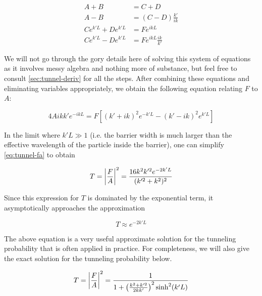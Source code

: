 \begin{align*}
	A + B &= C + D \\
	A - B &= (C - D)\frac{k'}{ik} \\
	Ce^{k'L} + De^{k'L} &= Fe^{ikL} \\
	Ce^{k'L} - De^{k'L} &= Fe^{ikL}\frac{ik}{k'}
\end{align*}

We will not go through the gory details here of solving this system of equations as it involves messy algebra and nothing more of substance, but feel free to consult \autoref{sec:tunnel-deriv} for all the steps. 
After combining these equations and eliminating variables appropriately, we obtain the following equation relating $F$ to $A$:

\begin{equation}
	4Aikk'e^{-ikL} = F \left[(k'+ik)^2e^{-k'L} - (k'-ik)^2e^{k'L}\right] \label{eq:tunnel-fa}
\end{equation}

In the limit where $k'L \gg 1$ (i.e. the barrier width is much larger than the effective wavelength of the particle inside the barrier), one can simplify \autoref{eq:tunnel-fa} to obtain

\begin{equation}
	T = \abs{\frac{F}{A}}^2 = \frac{16k^2k^{\prime 2}e^{-2k'L}}{(k^{\prime 2}+k^2)^2} \label{eq:tunnel-prob}
\end{equation}

Since this expression for $T$ is dominated by the exponential term, it asymptotically approaches the approximation

\begin{tcolorbox}[title = Tunneling probability approximation when $E < V_0$] \vspace{-2ex}
	\begin{equation}
		T \approx e^{-2k'L} \label{eq:tunnel-approx}
	\end{equation}
\end{tcolorbox}

The above equation is a very useful approximate solution for the tunneling probability that is often applied in practice. 
For completeness, we will also give the exact solution for the tunneling probability below.

\begin{tcolorbox}[title = Tunneling probability exact solution when $E < V_0$] \vspace{-2ex}
	\begin{equation}
		T = \abs{\frac{F}{A}}^2 = \frac{1}{1 + \left(\frac{k^2+k^{\prime 2}}{2kk'}\right)^2 \sinh^2(k'L)} \label{eq:tunnel-prob-full}
	\end{equation}
\end{tcolorbox}

